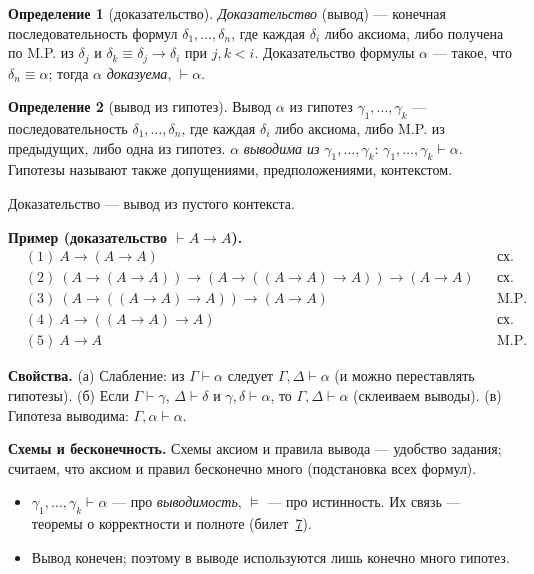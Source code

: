 \documentclass[11pt,a4paper]{article}
\newcommand{\vd}{\vdash}
\theoremstyle{definition}
\newtheorem*{dfn}{Определение}
\begin{document}
\begin{dfn}[доказательство]
\emph{Доказательство} (вывод) --- конечная последовательность формул $\delta_1,\dots,\delta_n$, где каждая $\delta_i$ либо
аксиома, либо получена по M.P. из $\delta_j$ и $\delta_k\equiv\delta_j\to\delta_i$ при $j,k<i$.
Доказательство формулы $\alpha$ --- такое, что $\delta_n\equiv\alpha$; тогда $\alpha$ \emph{доказуема}, $\vd\alpha$.
\end{dfn}
\begin{dfn}[вывод из гипотез]
Вывод $\alpha$ из гипотез $\gamma_1,\dots,\gamma_k$ --- последовательность $\delta_1,\dots,\delta_n$, где каждая $\delta_i$ либо аксиома,
либо M.P. из предыдущих, либо одна из гипотез. $\alpha$ \emph{выводима из} $\gamma_1,\dots,\gamma_k$: $\gamma_1,\dots,\gamma_k\vd\alpha$.
Гипотезы называют также допущениями, предположениями, контекстом.
\end{dfn}
Доказательство --- вывод из пустого контекста.

\textbf{Пример (доказательство $\vd A\to A$).}
\begin{align*}
&(1)\ A\to(A\to A) &&\text{сх.\ акс.\ 1}\\
&(2)\ (A\to(A\to A))\to(A\to((A\to A)\to A))\to(A\to A) &&\text{сх.\ акс.\ 2}\\
&(3)\ (A\to((A\to A)\to A))\to(A\to A) &&\text{M.P.\ 1,2}\\
&(4)\ A\to((A\to A)\to A) &&\text{сх.\ акс.\ 1}\\
&(5)\ A\to A &&\text{M.P.\ 4,3}
\end{align*}

\textbf{Свойства.} (а) Слабление: из $\Gamma\vd\alpha$ следует $\Gamma,\Delta\vd\alpha$ (и можно переставлять гипотезы).
(б) Если $\Gamma\vd\gamma$, $\Delta\vd\delta$ и $\gamma,\delta\vd\alpha$, то $\Gamma,\Delta\vd\alpha$ (склеиваем выводы). (в) Гипотеза выводима: $\Gamma,\alpha\vd\alpha$.

\textbf{Схемы и бесконечность.} Схемы аксиом и правила вывода --- удобство задания; считаем, что аксиом и правил
бесконечно много (подстановка всех формул).

\begin{warn}
\begin{itemize}
\item $\gamma_1,\dots,\gamma_k\vd\alpha$ --- про \emph{выводимость}, $\models$ --- про истинность. Их связь --- теоремы о корректности и полноте (билет~\hyperref[T:7]{7}).
\item Вывод конечен; поэтому в выводе используются лишь конечно много гипотез.
\end{itemize}
\end{warn}
\end{document}
